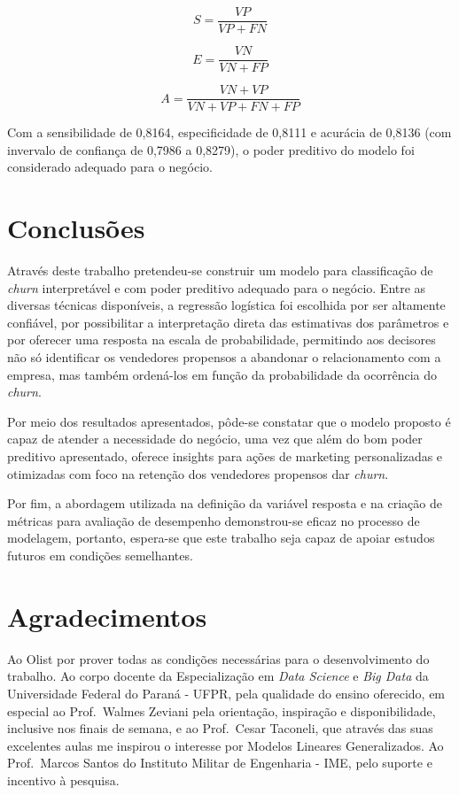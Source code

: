 \documentclass[twocolumn]{rbef}
\newcommand{\1}{\mathbbm{1}}
\begin{document}
\begin{equation}
S = \dfrac{VP}{VP+FN}\label{eq:sensitivity}
\end{equation}

\begin{equation}
E = \dfrac{VN}{VN+FP}\label{eq:specificity}
\end{equation}

\begin{equation}
A = \dfrac{VN+VP}{VN+VP+FN+FP}\label{eq:accuracy}
\end{equation}

Com a sensibilidade de 0,8164, especificidade de 0,8111 e acurácia de 0,8136 (com invervalo de confiança de 0,7986 a 0,8279), o poder preditivo do modelo foi considerado adequado para o negócio.

\hypertarget{conclusuxf5es}{%
\section{Conclusões}\label{conclusuxf5es}}

Através deste trabalho pretendeu-se construir um modelo para classificação de \textit{churn} interpretável e com poder preditivo adequado para o negócio. Entre as diversas técnicas disponíveis, a regressão logística foi escolhida por ser altamente confiável, por possibilitar a interpretação direta das estimativas dos parâmetros e por oferecer uma resposta na escala de probabilidade, permitindo aos decisores não só identificar os vendedores propensos a abandonar o relacionamento com a empresa, mas também ordená-los em função da probabilidade da ocorrência do \textit{churn}.

Por meio dos resultados apresentados, pôde-se constatar que o modelo proposto é capaz de atender a necessidade do negócio, uma vez que além do bom poder preditivo apresentado, oferece insights para ações de marketing personalizadas e otimizadas com foco na retenção dos vendedores propensos dar \textit{churn}.

Por fim, a abordagem utilizada na definição da variável resposta e na criação de métricas para avaliação de desempenho demonstrou-se eficaz no processo de modelagem, portanto, espera-se que este trabalho seja capaz de apoiar estudos futuros em condições semelhantes.

\hypertarget{agradecimentos}{%
\section{Agradecimentos}\label{agradecimentos}}

Ao Olist por prover todas as condições necessárias para o desenvolvimento do trabalho. Ao corpo docente da Especialização em \textit{Data Science} e \textit{Big Data} da Universidade Federal do Paraná - UFPR, pela qualidade do ensino oferecido, em especial ao Prof.~Walmes Zeviani pela orientação, inspiração e disponibilidade, inclusive nos finais de semana, e ao Prof.~Cesar Taconeli, que através das suas excelentes aulas me inspirou o interesse por Modelos Lineares Generalizados. Ao Prof.~Marcos Santos do Instituto Militar de Engenharia - IME, pelo suporte e incentivo à pesquisa.



\end{document}

